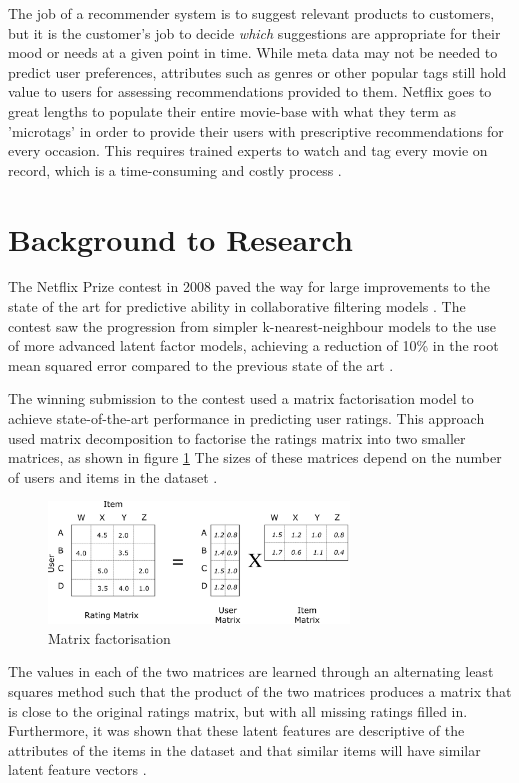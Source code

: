 The job of a recommender system is to suggest relevant products to customers, but it is the customer's job to decide \textit{which} suggestions are appropriate for their mood or needs at a given point in time. While meta data may not be needed to predict user preferences, attributes such as genres or other popular tags still hold value to users for assessing recommendations provided to them. Netflix goes to great lengths to populate their entire movie-base with what they term as 'microtags' in order to provide their users with prescriptive recommendations for every occasion. This requires trained experts to watch and tag every movie on record, which is a time-consuming and costly process \parencite{atlantic2014genres}.

\section{Background to Research}
The Netflix Prize contest in 2008 paved the way for large improvements to the state of the art for predictive ability in collaborative filtering models \parencite{netflix_description}. The contest saw the progression from simpler k-nearest-neighbour models to the use of more advanced latent factor models, achieving a reduction of 10\% in the root mean squared error compared to the previous state of the art \parencite{netflix_bellkor}.

The winning submission to the contest used a matrix factorisation model to achieve state-of-the-art performance in predicting user ratings. This approach used matrix decomposition to factorise the ratings matrix into two smaller matrices, as shown in figure \ref{fig:1_mat-fac} The sizes of these matrices depend on the number of users and items in the dataset \parencite{netflix_bellkor}.

\begin{figure}[H]
\centering
\includegraphics[width=8cm]{Figures/1_matrix-factorisation.png}
\decoRule
\caption[Matrix factorisation]{Matrix factorisation \parencite{liao2018towardsdatascience}}
\label{fig:1_mat-fac}
\end{figure}

The values in each of the two matrices are learned through an alternating least squares method such that the product of the two matrices produces a matrix that is close to the original ratings matrix, but with all missing ratings filled in. Furthermore, it was shown that these latent features are descriptive of the attributes of the items in the dataset and that similar items will have similar latent feature vectors \parencite{koren2009matrix}.

